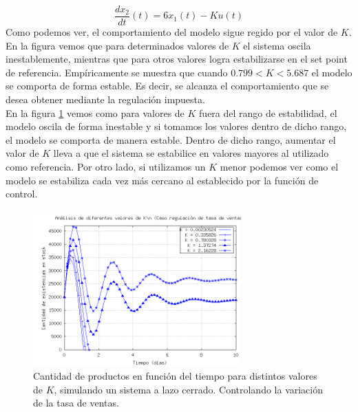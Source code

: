 \documentclass{sig-alternate}
\begin{document}
\begin{equation}
 \label{eq:x_2dot}
 \frac{dx_{2}}{dt}(t) = 6x_1(t) - Ku(t)
\end{equation}
Como podemos ver, el comportamiento del modelo sigue regido por el valor de $K$. En la figura vemos que para determinados valores de $K$ el sistema
oscila inestablemente, mientras que para otros valores logra estabilizarse en el set point de referencia. Empíricamente se muestra que cuando $0.799 < K < 5.687$ el modelo se comporta de forma estable. 
Es decir, se alcanza el comportamiento que se desea obtener mediante la regulación impuesta.\\
En la figura \ref{fig:lazo_cerrado_var_tventas} vemos como para valores de $K$ fuera del rango de estabilidad, el modelo oscila de
forma inestable y si tomamos los valores dentro de dicho rango, el modelo se comporta de manera estable. Dentro de dicho rango, aumentar el 
valor de $K$ lleva a que el sistema se estabilice en valores mayores al utilizado como referencia. Por otro lado, si utilizamos un $K$ menor podemos ver como el 
modelo se estabiliza cada vez más cercano al establecido por la función de control.

\begin{figure}[h]
\begin{center}
\includegraphics[width=8cm]{../src/k_plot2.png}
\caption{\label{fig:lazo_cerrado_var_tventas}Cantidad de productos en función del tiempo para distintos valores de $K$, simulando un sistema
a lazo cerrado. Controlando la variación de la tasa de ventas.}
\end{center}
\end{figure}

\newpage
\end{document}
